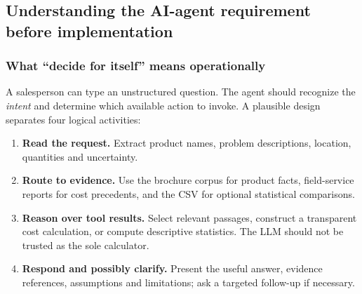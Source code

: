 \documentclass[11pt,a4paper]{article}
\newcommand{\term}[1]{\textbf{#1}}
\begin{document}
\subsection{Understanding the AI-agent requirement before implementation}
\subsubsection{What ``decide for itself'' means operationally}
A salesperson can type an unstructured question. The agent should recognize the \emph{intent} and determine which available action to invoke. A plausible design separates four logical activities:
\begin{enumerate}
\item \term{Read the request.} Extract product names, problem descriptions, location, quantities and uncertainty.
\item \term{Route to evidence.} Use the brochure corpus for product facts, field-service reports for cost precedents, and the CSV for optional statistical comparisons.
\item \term{Reason over tool results.} Select relevant passages, construct a transparent cost calculation, or compute descriptive statistics. The LLM should not be trusted as the sole calculator.
\item \term{Respond and possibly clarify.} Present the useful answer, evidence references, assumptions and limitations; ask a targeted follow-up if necessary.
\end{enumerate}

\begin{center}
\end{center}
\end{document}
